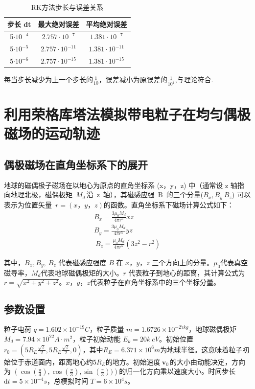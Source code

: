 \documentclass[11pt]{article}
\begin{document}
\begin{table}[h]
    \centering
    \begin{tabular}{|c|c|c|} \hline
        步长 dt &最大绝对误差  & 平均绝对误差\\ \hline
         5$\cdot 10^{-4}$& $2.757\cdot 10^{-7}$ & $1.381\cdot 10^{-7}$\\ \hline
         5$\cdot 10^{-5}$& $2.757\cdot 10^{-11}$ & $1.381\cdot 10^{-11}$\\ \hline
         5$\cdot 10^{-6}$& $2.757\cdot 10^{-15}$ & $1.381\cdot 10^{-15}$\\ \hline
    \end{tabular}
    \caption{RK方法步长与误差关系}
    \label{tab:my_label2}
\end{table}
每当步长减少为上一个步长的$\frac{1}{10}$，误差减小为原误差的$\frac{1}{10^4}$,与理论符合.
\section{利用荣格库塔法模拟带电粒子在均匀偶极磁场的运动轨迹}
\subsection{偶极磁场在直角坐标系下的展开}
地球的磁偶极子磁场在以地心为原点的直角坐标系 (x，y，z) 中（通常设 z 轴指向地理北极，磁偶极矩\ $M_{d\ }$沿\ z\ 轴），其磁感应强\ B\ 的三个分量($B_x,B_y{\ B}_z$) 可以表示为位置矢量\ $r=(x，y，z)的函数$。直角坐标系下磁场计算公式如下：
\begin{equation*}
    \begin{gathered}
        B_x=\frac{3μ_0M_d}{4πr^5}xz\\
        B_y=\frac{3μ_0M_d}{4πr^5}yz\\
        {\ B}_z=\frac{\mu_0M_d}{4\pi r^5}(3z^2-r^2)
    \end{gathered}
\end{equation*}



其中，$B_x, B_y, {\ B}_z$ 代表磁感应强度 $B$ 在 $x，y，z$ 三个方向上的分量。$\mu_0$代表真空磁导率，$M_d$代表地球磁偶极矩的大小。$r$ 代表粒子到地心的距离，其计算公式为$r=\sqrt{x^2+y^2+z^2}$。$x，y，z$代表粒子在直角坐标系中的三个坐标分量。

\subsection{参数设置}
粒子电荷 $q=1.602×10^{-19}C$，粒子质量 $m=1.6726×10^{-27kg}$，地球磁偶极矩$M_d=7.94×10^{22}A⋅m^2$，粒子初始动能 $E_k=20k\ eV$。初始位置 $r_0=(5R_E\frac{\sqrt{2}}{2},5R_E\frac{\sqrt{2}}{2},0)$，其中$R_E=6.371\times{10}^6m$为地球半径。这意味着粒子初始位于赤道面内，距离地心约$5R_E$的地方。初始速度$\ \mathbf{v}_{0\ }$的大小由动能决定，方向为 $(\cos{(\frac{\pi}{4})},\cos{(\frac{\pi}{3})},\sin{(\frac{\pi}{3}))}) $的归一化方向乘以速度大小。时间步长 $\mathrm{d}t=5× 10^{-4}s$，总模拟时间 $T=6×{10}^4s$。
\end{document}
